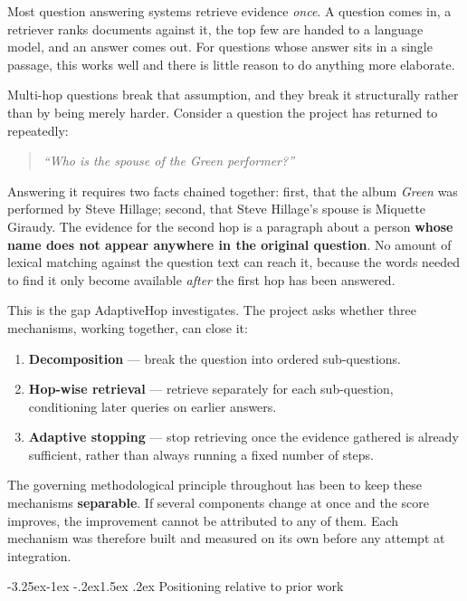 \documentclass[11pt,a4paper]{article}
\makeatletter
\renewcommand\subsection{\@startsection{subsection}{2}{\z@}%
  {-3.25ex\@plus -1ex \@minus -.2ex}{1.5ex \@plus .2ex}%
  {\color{accent}\normalfont\large\bfseries}}
\makeatother
\begin{document}
Most question answering systems retrieve evidence \emph{once}. A question comes
in, a retriever ranks documents against it, the top few are handed to a language
model, and an answer comes out. For questions whose answer sits in a single
passage, this works well and there is little reason to do anything more
elaborate.

Multi-hop questions break that assumption, and they break it structurally rather
than by being merely harder. Consider a question the project has returned to
repeatedly:

\begin{quote}
\emph{``Who is the spouse of the Green performer?''}
\end{quote}

Answering it requires two facts chained together: first, that the album
\emph{Green} was performed by Steve Hillage; second, that Steve Hillage's spouse
is Miquette Giraudy. The evidence for the second hop is a paragraph about a
person \textbf{whose name does not appear anywhere in the original question}. No
amount of lexical matching against the question text can reach it, because the
words needed to find it only become available \emph{after} the first hop has been
answered.

This is the gap AdaptiveHop investigates. The project asks whether three
mechanisms, working together, can close it:

\begin{enumerate}
  \item \textbf{Decomposition} --- break the question into ordered sub-questions.
  \item \textbf{Hop-wise retrieval} --- retrieve separately for each sub-question,
        conditioning later queries on earlier answers.
  \item \textbf{Adaptive stopping} --- stop retrieving once the evidence gathered
        is already sufficient, rather than always running a fixed number of steps.
\end{enumerate}

The governing methodological principle throughout has been to keep these
mechanisms \textbf{separable}. If several components change at once and the score
improves, the improvement cannot be attributed to any of them. Each mechanism
was therefore built and measured on its own before any attempt at integration.

\subsection{Positioning relative to prior work}
\end{document}
